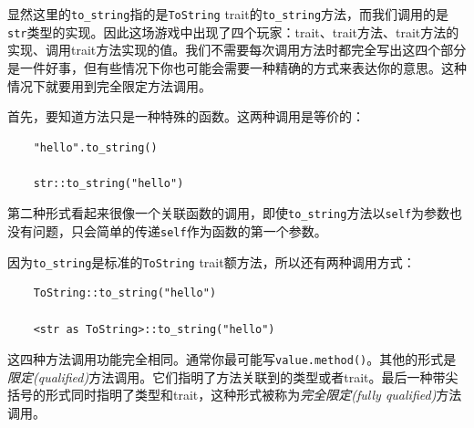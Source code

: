 显然这里的\texttt{to\_string}指的是\texttt{ToString} trait的\texttt{to\_string}方法，而我们调用的是\texttt{str}类型的实现。因此这场游戏中出现了四个玩家：trait、trait方法、trait方法的实现、调用trait方法实现的值。我们不需要每次调用方法时都完全写出这四个部分是一件好事，但有些情况下你也可能会需要一种精确的方式来表达你的意思。这种情况下就要用到完全限定方法调用。

首先，要知道方法只是一种特殊的函数。这两种调用是等价的：
\begin{verbatim}
    "hello".to_string()

    str::to_string("hello")
\end{verbatim}

第二种形式看起来很像一个关联函数的调用，即使\texttt{to\_string}方法以\texttt{self}为参数也没有问题，只会简单的传递\texttt{self}作为函数的第一个参数。

因为\texttt{to\_string}是标准的\texttt{ToString} trait额方法，所以还有两种调用方式：
\begin{verbatim}
    ToString::to_string("hello")

    <str as ToString>::to_string("hello")
\end{verbatim}

这四种方法调用功能完全相同。通常你最可能写\texttt{value.method()}。其他的形式是\emph{限定(qualified)}方法调用。它们指明了方法关联到的类型或者trait。最后一种带尖括号的形式同时指明了类型和trait，这种形式被称为\emph{完全限定(fully qualified)}方法调用。

